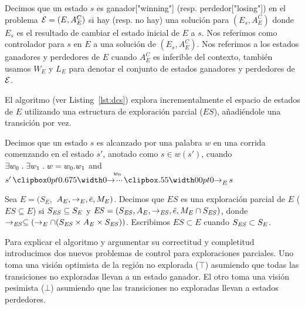 \begin{notation}
Decimos que un estado $s$ es ganador["winning"] (resp. perdedor["losing"]) en el problema $\mathcal{E} = (E, A_E^C)$ 
si hay (resp. no hay) una solución para $(E_s, A_E^C)$ donde $E_s$ es el resultado de cambiar el estado inicial de $E$ a $s$.
Nos referimos como controlador para $s$ en $E$ a una solución de $(E_s, A_E^C)$.
Nos referimos a los estados ganadores y perdedores de $E$ cuando $A_E^C$ es inferible del contexto, también usamos $W_E$ y $L_E$ para denotar el conjunto de estados ganadores y perdedores de $\mathcal{E}$.
\end{notation}

El algoritmo (ver Listing~\ref{lst:dcs}) explora incrementalmente el espacio de estados de $E$ utilizando una estructura de exploración parcial ($ES$), añadiéndole una transición por vez.

\begin{notation}
	Decimos que un estado $s$ es alcanzado por una palabra $w$ en una corrida comenzando en el estado $s'$, anotado como $s \in w(s')$, cuando $\exists w_0 \;.\; \exists w_1 \;.\; w = w_0.w_1$ 
	and $s' \runw{w_0}{E} s$
\end{notation}

\begin{definition}
 \label{def:unexploredTo}
Sea $E = (S_E,$ $A_E, \rightarrow_E, \bar{e}, M_E)$. Decimos que $ES$ es una exploración parcial de $E$ ($ES \subseteq E$) si $S_{\mathit{ES}} \subseteq 
S_E$ y $\mathit{ES} = (S_{\mathit{ES}},A_E, \rightarrow_{\mathit{ES}},\bar{e},M_E 
\cap S_{\mathit{ES}})$, donde $ \rightarrow_{\mathit{ES}} \subseteq (\rightarrow_E \cap 
(S_{\mathit{ES}} \times A_E \times S_{\mathit{ES}}))$. Escribimos $ES \subset E$ cuando $S_{\mathit{ES}} \subset S_E$.
\end{definition}

Para explicar el algoritmo y argumentar su correctitud y completitud introducimos dos nuevos problemas de control para exploraciones parciales. Uno toma una visión optimista de la región no explorada ($\top$) asumiendo que todas las transiciones no exploradas llevan a un estado ganador. El otro toma una visión pesimista ($\bot$) asumiendo que las transiciones no exploradas llevan a estados perdedores.

